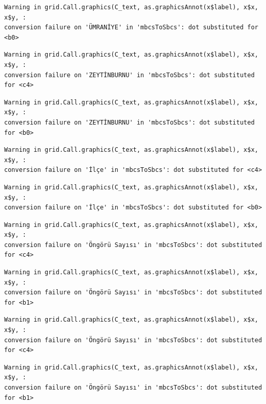 \documentclass[
  11pt,
  a4paper,
  DIV=11,
  numbers=noendperiod]{scrartcl}
\begin{document}
\begin{verbatim}
Warning in grid.Call.graphics(C_text, as.graphicsAnnot(x$label), x$x, x$y, :
conversion failure on 'ÜMRANİYE' in 'mbcsToSbcs': dot substituted for <b0>
\end{verbatim}

\begin{verbatim}
Warning in grid.Call.graphics(C_text, as.graphicsAnnot(x$label), x$x, x$y, :
conversion failure on 'ZEYTİNBURNU' in 'mbcsToSbcs': dot substituted for <c4>
\end{verbatim}

\begin{verbatim}
Warning in grid.Call.graphics(C_text, as.graphicsAnnot(x$label), x$x, x$y, :
conversion failure on 'ZEYTİNBURNU' in 'mbcsToSbcs': dot substituted for <b0>
\end{verbatim}

\begin{verbatim}
Warning in grid.Call.graphics(C_text, as.graphicsAnnot(x$label), x$x, x$y, :
conversion failure on 'İlçe' in 'mbcsToSbcs': dot substituted for <c4>
\end{verbatim}

\begin{verbatim}
Warning in grid.Call.graphics(C_text, as.graphicsAnnot(x$label), x$x, x$y, :
conversion failure on 'İlçe' in 'mbcsToSbcs': dot substituted for <b0>
\end{verbatim}

\begin{verbatim}
Warning in grid.Call.graphics(C_text, as.graphicsAnnot(x$label), x$x, x$y, :
conversion failure on 'Öngörü Sayısı' in 'mbcsToSbcs': dot substituted for <c4>
\end{verbatim}

\begin{verbatim}
Warning in grid.Call.graphics(C_text, as.graphicsAnnot(x$label), x$x, x$y, :
conversion failure on 'Öngörü Sayısı' in 'mbcsToSbcs': dot substituted for <b1>
\end{verbatim}

\begin{verbatim}
Warning in grid.Call.graphics(C_text, as.graphicsAnnot(x$label), x$x, x$y, :
conversion failure on 'Öngörü Sayısı' in 'mbcsToSbcs': dot substituted for <c4>
\end{verbatim}

\begin{verbatim}
Warning in grid.Call.graphics(C_text, as.graphicsAnnot(x$label), x$x, x$y, :
conversion failure on 'Öngörü Sayısı' in 'mbcsToSbcs': dot substituted for <b1>
\end{verbatim}
\end{document}
